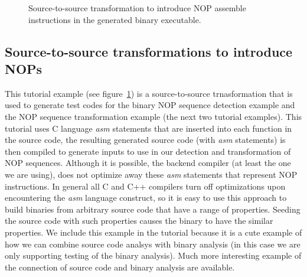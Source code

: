 \begin{figure}[!h]
{\indent
{\mySmallFontSize

\begin{latexonly}
   
\end{latexonly}

\begin{htmlonly}
   
\end{htmlonly}

}
}
\caption{Source-to-source transformation to introduce NOP assemble instructions in the
    generated binary executable.}
\label{Tutorial:exampleTransformSourceToInsertNOPs}
\end{figure}


\subsection{Source-to-source transformations to introduce NOPs}

   This tutorial example (see figure~\ref{Tutorial:exampleTransformSourceToInsertNOPs})
is a source-to-source trnasformation that is used to
generate test codes for the binary NOP sequence detection example and the 
NOP sequence transformation example (the next two tutorial examples).
This tutorial uses C language {\em asm} statements that are inserted into
each function in the source code, the resulting generated source code (with {\em asm}
statements) is then compiled to generate inputs to use in our detection and
transformation of NOP sequences.  Although it is possible, the backend
compiler (at least the one we are using), does not optimize away these 
{\em asm} statements that represent NOP instructions.  In general all
C and C++ compilers turn off optimizations upon encountering the {\em asm}
language construct, so it is easy to use this approach to build binaries
from arbitrary source code that have a range of properties.  Seeding 
the source code with such properties causes the binary to have the similar
properties.  We include this example in the tutorial because it is a cute
example of how we can combine source code analsys with binary analysis
(in this case we are only supporting testing of the binary analysis).
Much more interesting example of the connection of source code and
binary analysis are available.



